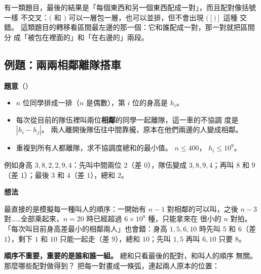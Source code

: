 有一類題目，最後的結果是「每個東西和另一個東西配成一對」，而且配對像括號一樣
不交叉：$($ 和 $)$ 可以一層包一層，也可以並排，但不會出現 $( [ ) ]$ 這種
交錯。 這類題目的轉移看區間最左邊的那一個：它和誰配成一對，那一對就把區間分
成「被包在裡面的」和「在右邊的」兩段。

\subsection{例題：兩兩相鄰離隊搭車}
\label{sec:ex-ivdp-pairs}

\textbf{題意}（）

\begin{itemize}
\item $n$ 位同學排成一排（$n$ 是偶數），第 $i$ 位的身高是 $h_i$。
\item 每次從目前的隊伍裡叫兩位\textbf{相鄰}的同學一起離隊，這一車的不協調
度是 $|h_i - h_j|$。 兩人離開後隊伍往中間靠攏，原本在他們兩邊的人變成相鄰。
\item 重複到所有人都離隊，求不協調度總和的最小值。 $n \le 400$，
$h_i \le 10^9$。
\end{itemize}

例如身高 $3, 8, 2, 2, 9, 4$：先叫中間兩位 $2$（差 $0$），隊伍變成
$3, 8, 9, 4$；再叫 $8$ 和 $9$（差 $1$）；最後 $3$ 和 $4$（差 $1$），總和 $2$。

\textbf{想法}

最直接的是模擬每一種叫人的順序：一開始有 $n - 1$ 對相鄰的可以叫，之後
$n - 3$ 對……全部乘起來，$n = 20$ 時已經超過 $6 \times 10^8$ 種，只能拿來在
很小的 $n$ 對拍。 「每次叫目前身高差最小的相鄰兩人」也會錯：身高
$1, 5, 6, 10$ 時先叫 $5$ 和 $6$（差 $1$），剩下 $1$ 和 $10$ 只能一起走（差
$9$），總和 $10$；先叫 $1, 5$ 再叫 $6, 10$ 只要 $8$。

\textbf{順序不重要，重要的是誰和誰一組。} 總和只看最後的配對，和叫人的順序
無關。 那麼哪些配對做得到？ 把每一對畫成一條弧，連起兩人原本的位置：

\begin{center}
\label{fig:ivdp-arcs}
\end{center}

